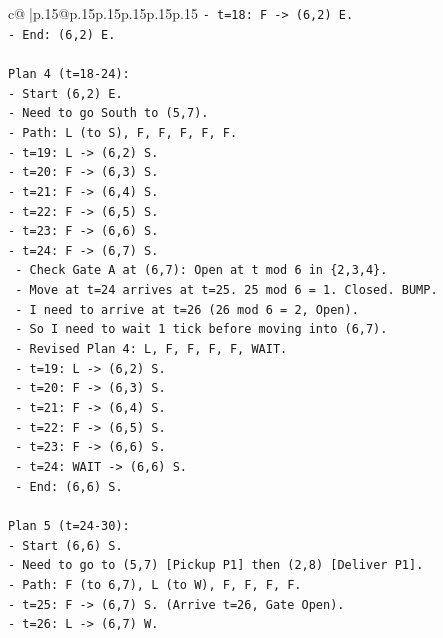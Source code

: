 \documentclass{article}
\begin{document}
{\begin{supertabular}{c@{$\;$}|p{.15\linewidth}@{}p{.15\linewidth}p{.15\linewidth}p{.15\linewidth}p{.15\linewidth}p{.15\linewidth}}
{{{\texttt{{-} t=18: F {-}> (6,2) E.} \\
\texttt{{-} End: (6,2) E.} \\
\\ 
\texttt{Plan 4 (t=18{-}24):} \\
\texttt{{-} Start (6,2) E.} \\
\texttt{{-} Need to go South to (5,7).} \\
\texttt{{-} Path: L (to S), F, F, F, F, F.} \\
\texttt{{-} t=19: L {-}> (6,2) S.} \\
\texttt{{-} t=20: F {-}> (6,3) S.} \\
\texttt{{-} t=21: F {-}> (6,4) S.} \\
\texttt{{-} t=22: F {-}> (6,5) S.} \\
\texttt{{-} t=23: F {-}> (6,6) S.} \\
\texttt{{-} t=24: F {-}> (6,7) S.} \\
\texttt{  {-} Check Gate A at (6,7): Open at t mod 6 in \{2,3,4\}.} \\
\texttt{  {-} Move at t=24 arrives at t=25. 25 mod 6 = 1. Closed. BUMP.} \\
\texttt{  {-} I need to arrive at t=26 (26 mod 6 = 2, Open).} \\
\texttt{  {-} So I need to wait 1 tick before moving into (6,7).} \\
\texttt{  {-} Revised Plan 4: L, F, F, F, F, WAIT.} \\
\texttt{  {-} t=19: L {-}> (6,2) S.} \\
\texttt{  {-} t=20: F {-}> (6,3) S.} \\
\texttt{  {-} t=21: F {-}> (6,4) S.} \\
\texttt{  {-} t=22: F {-}> (6,5) S.} \\
\texttt{  {-} t=23: F {-}> (6,6) S.} \\
\texttt{  {-} t=24: WAIT {-}> (6,6) S.} \\
\texttt{  {-} End: (6,6) S.} \\
\\ 
\texttt{Plan 5 (t=24{-}30):} \\
\texttt{{-} Start (6,6) S.} \\
\texttt{{-} Need to go to (5,7) {[}Pickup P1{]} then (2,8) {[}Deliver P1{]}.} \\
\texttt{{-} Path: F (to 6,7), L (to W), F, F, F, F.} \\
\texttt{{-} t=25: F {-}> (6,7) S. (Arrive t=26, Gate Open).} \\
\texttt{{-} t=26: L {-}> (6,7) W.} \\
}}}
\end{supertabular}}
\end{document}
